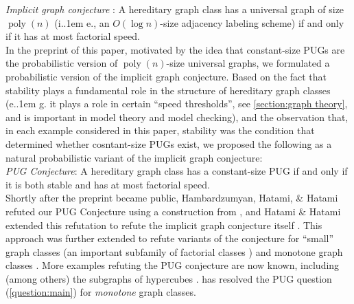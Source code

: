 \documentclass{theoretics}
\makeatletter
\DeclareMathOperator{\poly}{poly}
\newcommand*\ie{i.\kern.1em e.\@\xspace} %
\newcommand*\eg{e.\kern.1em g.\@\xspace} %
\makeatother
\begin{document}
\noindent\emph{Implicit graph conjecture} \cite{KNR92,Spin03}:  A hereditary graph class
has a universal graph of size $\poly(n)$ (\ie, an $O(\log n)$-size adjacency labeling scheme) if
and only if it has at most factorial speed.\\

In the preprint of this paper, motivated by the idea that constant-size PUGs are the probabilistic
version of $\poly(n)$-size universal graphs, we formulated a probabilistic version of the implicit graph conjecture. Based on the fact that stability plays a fundamental role in the structure of hereditary
graph classes (\eg it plays a role in certain ``speed thresholds'', see \cref{section:graph theory},
and is important in model theory and model checking), and the observation that, in each example
considered in this paper, stability was the condition that determined whether cosntant-size PUGs
exist, we proposed the following as a natural probabilistic variant of the implicit graph
conjecture:\\

\noindent\emph{PUG Conjecture}: A hereditary graph class has a constant-size PUG if and only
if it is both stable and has at most factorial speed.\\

Shortly after the preprint became public, Hambardzumyan, Hatami, \& Hatami refuted our PUG
Conjecture \cite{HHH22counter} using a construction from \cite{HHH23dimfree}, and Hatami \& Hatami
extended this refutation to refute the implicit graph conjecture itself \cite{HH22}.  This approach
was further extended to refute variants of the conjecture for ``small'' graph classes (an important
subfamily of factorial classes \cite{BDSZZ24}) and monotone graph classes \cite{BDSZZ23}. More
examples refuting the PUG conjecture are now known, including (among others) the subgraphs of
hypercubes \cite{EHK22}. \cite{EHK22} has resolved the PUG question (\cref{question:main}) for
\emph{monotone} graph classes.
\end{document}
